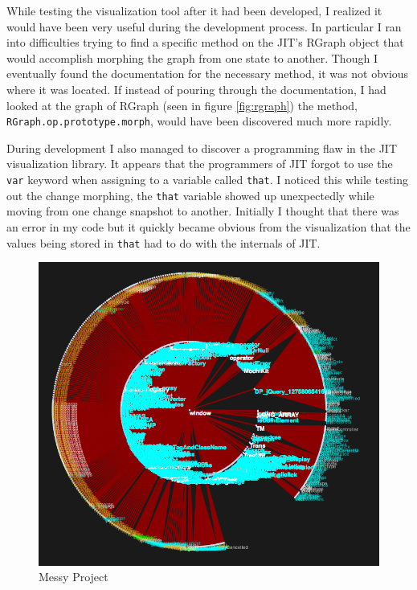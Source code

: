 \documentclass[]{article}
\begin{document}
While testing the visualization tool after it had been developed, I realized it would have been very useful during the development process. In particular I ran into difficulties trying to find a specific method on the JIT's RGraph object that would accomplish morphing the graph from one state to another. Though I eventually found the documentation for the necessary method, it was not obvious where it was located. If instead of pouring through the documentation, I had looked at the graph of RGraph (seen in figure \ref{fig:rgraph}) the method, {\tt RGraph.op.prototype.morph}, would have been discovered much more rapidly.

During development I also managed to discover a programming flaw in the JIT visualization library. It appears that the programmers of JIT forgot to use the {\tt var} keyword when assigning to a variable called {\tt that}. I noticed this while testing out the change morphing, the {\tt that} variable showed up unexpectedly while moving from one change snapshot to another. Initially I thought that there was an error in my code but it quickly became obvious from the visualization that the values being stored in {\tt that} had to do with the internals of JIT.

\begin{figure}[h]
  \begin{center}
    \includegraphics[scale=.38]{messy.png}
  \end{center}
  \caption{Messy Project}
  \label{fig:messy}
\end{figure}
\end{document}
